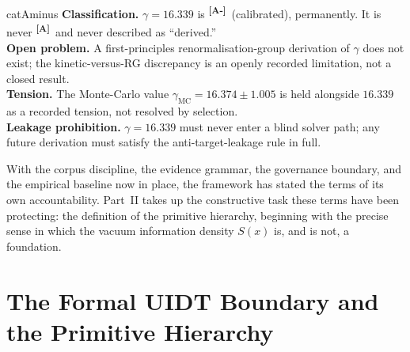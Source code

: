 \documentclass[12pt,a4paper,twoside]{article}
\theoremstyle{plain}
\theoremstyle{definition}
\theoremstyle{remark}
\newcommand{\catmark}[1]{\textsuperscript{\textsf{\textbf{[#1]}}}}
\newcommand{\Sx}{S(x)}
\newcommand{\Bdelta}{\hyperref[box:pi-override-delta]{\catmark{B}}}
\newcommand{\GammaGeom}{16.339} %
\newcommand{\GammaMC}{16.374 \pm 1.005} %
\begin{document}
\begin{evidencebox}{catAminus}
\textbf{Classification.} $\gamma = \GammaGeom$ is \catmark{A-}\ (calibrated), permanently. It is never \catmark{A}\ and never described as
``derived.''\\[0.3em]
\textbf{Open problem.} A first-principles renormalisation-group derivation of $\gamma$ does not exist; the kinetic-versus-RG discrepancy is an openly recorded
limitation, not a closed result.\\[0.3em]
\textbf{Tension.} The Monte-Carlo value $\gamma_{\mathrm{MC}} = \GammaMC$ is held alongside $16.339$ as a recorded tension, not resolved by
selection.\\[0.3em]
\textbf{Leakage prohibition.} $\gamma = 16.339$ must never enter a blind solver path; any future derivation must satisfy the anti-target-leakage rule in full.
\end{evidencebox}

\noindent With the corpus discipline, the evidence grammar, the governance boundary, and the empirical baseline now in place, the framework has stated the terms of its own accountability. Part~II takes up the constructive task these terms have been protecting: the definition of the primitive hierarchy, beginning with the precise sense in which the vacuum information density $\Sx$ is, and is not, a foundation.


\part{The Formal UIDT Boundary and the Primitive Hierarchy}
\label{part:primitive-hierarchy}
\end{document}
